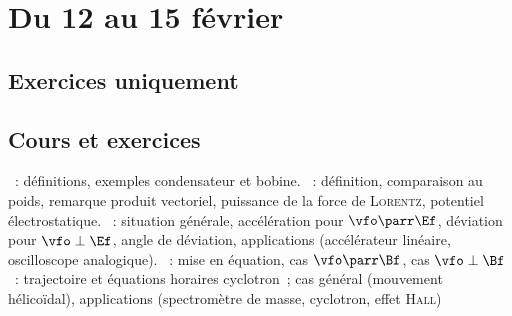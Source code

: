 \documentclass[a4paper, 12pt, final, garamond]{book}
\begin{document}
\setcounter{chapter}{17}

\chapter{Du 12 au 15 f\'evrier}

\section{Exercices uniquement}

\section{Cours et exercices}
\begin{enumerate}[label=\Roman*]
	~: définitions, exemples condensateur
	et bobine.
	~: définition, comparaison au poids,
	remarque produit vectoriel, puissance de la force de \textsc{Lorentz},
	potentiel électrostatique.
	~: situation générale, accélération
	pour $\vfo\parr\Ef$, déviation pour $\vfo\perp\Ef$, angle de déviation,
	applications (accélérateur linéaire, oscilloscope analogique).
	~: mise en équation, cas
	$\vfo\parr\Bf$, cas $\vfo\perp\Bf$~: trajectoire et équations horaires
	cyclotron~; cas général (mouvement hélicoïdal), applications
	(spectromètre de masse, cyclotron, effet \textsc{Hall})
\end{enumerate}
\end{document}
